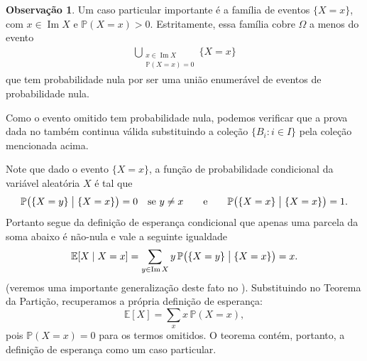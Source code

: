 \documentclass[12pt,portuguese]{article}
\theoremstyle{definition}
\newtheorem{remark}[remark]{Observação}
\begin{document}
\begin{remark}\label{rem:particao-esperanca-degenerada}
Um caso particular importante é a família de eventos
\(\{X = x\}\), com \(x \in \operatorname{Im} X\) e \(\mathbb{P}(X = x) > 0\).
Estritamente, essa família cobre \(\Omega\) a menos do evento
\begin{align*}
\bigcup_{ \substack {x \in \operatorname{Im} X \\[0.1cm] \mathbb{P}(X = x) = 0 }} \{X = x\}
\end{align*}
que tem probabilidade nula por ser uma união enumerável de eventos de probabilidade nula. 

Como o evento omitido tem probabilidade nula, podemos verificar
que a prova dada no  também continua válida substituindo
a coleção $\{B_i: i\in I\}$ pela coleção mencionada acima. 
 
Note que dado o evento
\(\{X = x\}\), a função de probabilidade condicional da variável aleatória \(X\) 
é tal que 
\begin{align*}
\mathbb{P}\bigl(\{X=y\} \bigm| \{X=x\}\bigr) = 0\quad \text{se}\  y\neq x \qquad \text{e}\qquad \mathbb{P}\bigl(\{X=x\} \bigm| \{X=x\}\bigr) = 1.
\end{align*}
Portanto segue da definição de esperança condicional que 
apenas uma parcela da soma abaixo é não-nula e vale a seguinte igualdade
\begin{align*}
\mathbb{E}[X \mid X = x] = \sum_{y \in\operatorname{Im} X } y \, \mathbb{P}\bigl(\{X=y\} \bigm| \{X=x\}\bigr) = x.
\end{align*}
(veremos uma importante generalização deste fato no ). 
Substituindo no Teorema da Partição,
recuperamos a própria definição de esperança:
\[
\mathbb{E}[X] = \sum_{x} x \, \mathbb{P}(X = x),
\]
pois \(\mathbb{P}(X = x) = 0\) para os termos omitidos. O teorema contém,
portanto, a definição de esperança como um caso particular.
\end{remark}
\end{document}
